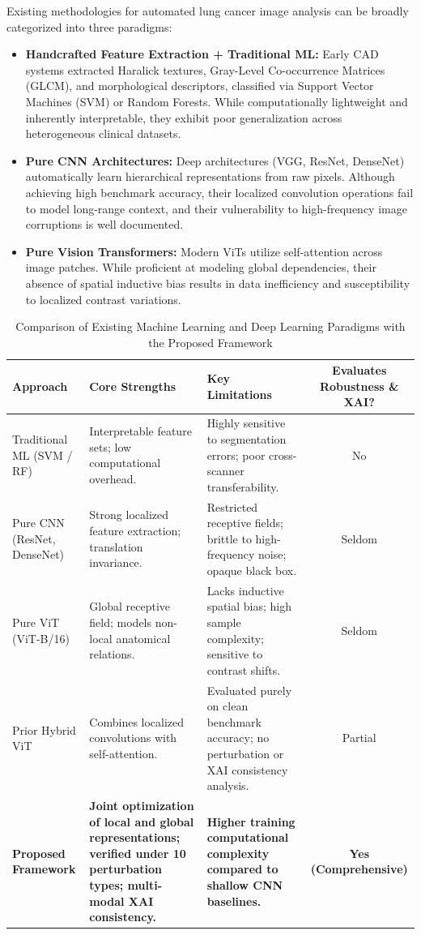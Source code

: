 \documentclass[conference]{IEEEtran}
\begin{document}
Existing methodologies for automated lung cancer image analysis can be broadly categorized into three paradigms:
\begin{itemize}
    \item \textbf{Handcrafted Feature Extraction + Traditional ML:} Early CAD systems extracted Haralick textures, Gray-Level Co-occurrence Matrices (GLCM), and morphological descriptors, classified via Support Vector Machines (SVM) or Random Forests. While computationally lightweight and inherently interpretable, they exhibit poor generalization across heterogeneous clinical datasets.
    \item \textbf{Pure CNN Architectures:} Deep architectures (VGG, ResNet, DenseNet) automatically learn hierarchical representations from raw pixels. Although achieving high benchmark accuracy, their localized convolution operations fail to model long-range context, and their vulnerability to high-frequency image corruptions is well documented.
    \item \textbf{Pure Vision Transformers:} Modern ViTs utilize self-attention across image patches. While proficient at modeling global dependencies, their absence of spatial inductive bias results in data inefficiency and susceptibility to localized contrast variations.
\end{itemize}

\begin{table}[t]
\caption{Comparison of Existing Machine Learning and Deep Learning Paradigms with the Proposed Framework}
\label{tab:existing_vs_proposed}
\centering
\begin{tabular}{lp{5.5cm}p{5.5cm}c}
\toprule
\textbf{Approach} & \textbf{Core Strengths} & \textbf{Key Limitations} & \textbf{Evaluates Robustness \& XAI?} \\
\midrule
Traditional ML (SVM / RF) & Interpretable feature sets; low computational overhead. & Highly sensitive to segmentation errors; poor cross-scanner transferability. & No \\
Pure CNN (ResNet, DenseNet) & Strong localized feature extraction; translation invariance. & Restricted receptive fields; brittle to high-frequency noise; opaque black box. & Seldom \\
Pure ViT (ViT-B/16) & Global receptive field; models non-local anatomical relations. & Lacks inductive spatial bias; high sample complexity; sensitive to contrast shifts. & Seldom \\
Prior Hybrid ViT \cite{ORIGINAL_PROJECT_REF} & Combines localized convolutions with self-attention. & Evaluated purely on clean benchmark accuracy; no perturbation or XAI consistency analysis. & Partial \\
\textbf{Proposed Framework} & \textbf{Joint optimization of local and global representations; verified under 10 perturbation types; multi-modal XAI consistency.} & \textbf{Higher training computational complexity compared to shallow CNN baselines.} & \textbf{Yes (Comprehensive)} \\
\bottomrule
\end{tabular}
\end{table}
\end{document}
